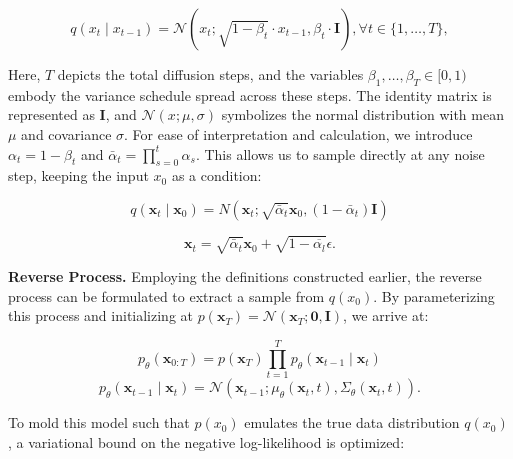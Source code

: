 \documentclass[preprint,12pt,authoryear]{elsarticle}
\begin{document}
\begin{equation}
	q\left(x_t \mid x_{t-1}\right)=\mathcal{N}\left(x_t ; \sqrt{1-\beta_t} \cdot x_{t-1}, \beta_t \cdot \mathbf{I}\right), \forall t \in\{1, \ldots, T\},
\end{equation}

Here, \(T\) depicts the total diffusion steps, and the variables \(\beta_1, \ldots, \beta_T \in[0,1)\) embody the variance schedule spread across these steps. The identity matrix is represented as \(\mathbf{I}\), and \(\mathcal{N}(x ; \mu, \sigma)\) symbolizes the normal distribution with mean \(\mu\) and covariance \(\sigma\). For ease of interpretation and calculation, we introduce \(\alpha_t=1-\beta_t\) and \(\bar{\alpha}_t=\prod_{s=0}^t \alpha_s\). This allows us to sample directly at any noise step, keeping the input \(x_0\) as a condition:

\begin{equation}
	q\left(\mathbf{x}_t \mid \mathbf{x}_0\right)=N\left(\mathbf{x}_t ; \sqrt{\bar{\alpha}_t} \mathbf{x}_0,\left(1-\bar{\alpha}_t\right) \mathbf{I}\right)
\end{equation}

\begin{equation}
	\mathbf{x}_t=\sqrt{\bar{\alpha}_t} \mathbf{x}_0+\sqrt{1-\overline{\alpha_l}} \epsilon .
\end{equation}

\textbf{Reverse Process.} Employing the definitions constructed earlier, the reverse process can be formulated to extract a sample from \(q\left(x_0\right)\). By parameterizing this process and initializing at \(p\left(\mathbf{x}_T\right)=\mathcal{N}\left(\mathbf{x}_T ; \mathbf{0}, \mathbf{I}\right)\), we arrive at:

\begin{equation}
	p_\theta\left(\mathbf{x}_{0: T}\right)=p\left(\mathbf{x}_T\right) \prod_{t=1}^T p_\theta\left(\mathbf{x}_{t-1} \mid \mathbf{x}_t\right)
\end{equation}
\begin{equation}
	p_\theta\left(\mathbf{x}_{t-1} \mid \mathbf{x}_t\right)=\mathcal{N}\left(\mathbf{x}_{t-1} ; \mu_\theta\left(\mathbf{x}_t, t\right), \Sigma_\theta\left(\mathbf{x}_t, t\right)\right) .
\end{equation}

To mold this model such that \(p\left(x_0\right)\) emulates the true data distribution \(q\left(x_0\right)\), a variational bound on the negative log-likelihood is optimized:
\end{document}
